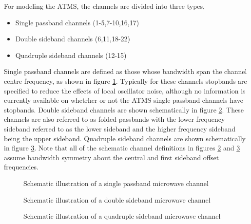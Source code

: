 For modeling the ATMS, the channels are divided into three types,
\begin{itemize}
  \item{Single passband channels (1-5,7-10,16,17)}
  \item{Double sideband channels (6,11,18-22)}
  \item{Quadruple sideband channels (12-15)}
\end{itemize}
Single passband channels are defined as those whose bandwidth span the channel centre frequency, as shown in figure \ref{fig:single_passband}. Typically for these channels stopbands are specified to reduce the effects of local oscillator noise, although no information is currently available on whetrher or not the ATMS single passband channels have stopbands. Double sideband channels are shown schematically in figure \ref{fig:double_sideband}. These channels are also referred to as folded passbands with the lower frequency sideband referred to as the lower sideband and the higher frequency sideband being the upper sideband. Quadruple sideband channels are shown schematically in figure \ref{fig:quadruple_sideband}. Note that all of the schematic channel definitions in figures \ref{fig:double_sideband} and \ref{fig:quadruple_sideband} assume bandwidth symmetry about the central and first sideband offset frequencies.
\begin{figure}[htp]
  \centering
  
  \caption{Schematic illustration of a single passband microwave channel}
  \label{fig:single_passband}
\end{figure}
\begin{figure}[htp]
  \centering
  
  \caption{Schematic illustration of a double sideband microwave channel}
  \label{fig:double_sideband}
\end{figure}
\begin{figure}[htp]
  \centering
  
  \caption{Schematic illustration of a quadruple sideband microwave channel}
  \label{fig:quadruple_sideband}
\end{figure}

